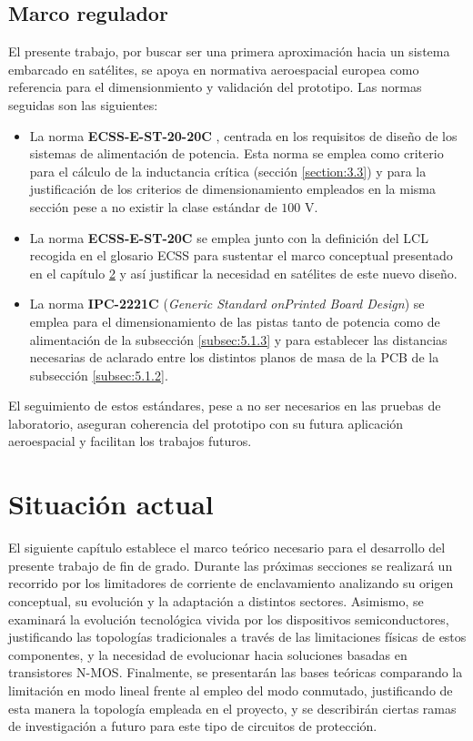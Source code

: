 \documentclass[12pt]{report} %
\begin{document}
\section{Marco regulador}
El presente trabajo, por buscar ser una primera aproximación hacia un sistema embarcado en satélites, se apoya en normativa aeroespacial europea como referencia para el dimensionmiento y validación del prototipo. Las normas seguidas son las siguientes: 
\begin{itemize}
  \item La norma \textbf{ECSS-E-ST-20-20C} \cite{european_cooperation_for_space_standardization_ecss_ecss-e-st-20-20c_2016}, centrada en los requisitos de diseño de los sistemas de alimentación de potencia. Esta norma se emplea como criterio para el cálculo de la inductancia crítica (sección \ref{section:3.3}) y para la justificación de los criterios de dimensionamiento empleados en la misma sección pese a no existir la clase estándar de $100$ V. 
  \item La norma \textbf{ECSS-E-ST-20C} \cite{european_cooperation_for_space_standardization_ecss_space_2022} se emplea junto con la definición del LCL recogida en el glosario ECSS \cite{european_cooperation_for_space_standardization_ecss_latching_nodate} para sustentar el marco conceptual presentado en el capítulo \ref{chapter: 2Situacionactual} y así justificar la necesidad en satélites de este nuevo diseño.
  \item La norma \textbf{IPC-2221C} \cite{ipc_association_connecting_electronics_industries_generic_nodate} (\textit{Generic Standard onPrinted Board Design}) se emplea para el dimensionamiento de las pistas tanto de potencia como de alimentación de la subsección \ref{subsec:5.1.3} y para establecer las distancias necesarias de aclarado entre los distintos planos de masa de la PCB de la subsección \ref{subsec:5.1.2}.
\end{itemize}
El seguimiento de estos estándares, pese a no ser necesarios en las pruebas de laboratorio, aseguran coherencia del prototipo con su futura aplicación aeroespacial y facilitan los trabajos futuros.
\chapter{Situación actual}
\label{chapter: 2Situacionactual}
El siguiente capítulo establece el marco teórico necesario para el desarrollo del presente trabajo de fin de grado. Durante las próximas secciones se realizará un recorrido por los limitadores de corriente de enclavamiento analizando su origen conceptual, su evolución y la adaptación a distintos sectores. Asimismo, se examinará la evolución tecnológica vivida por los dispositivos semiconductores, justificando las topologías tradicionales a través de las limitaciones físicas de estos componentes, y la necesidad de evolucionar hacia soluciones basadas en transistores N-MOS.
Finalmente, se presentarán las bases teóricas comparando la limitación en modo lineal frente al empleo del modo conmutado, justificando de esta manera la topología empleada en el proyecto, y se describirán ciertas ramas de investigación a futuro para este tipo de circuitos de protección.
\end{document}
